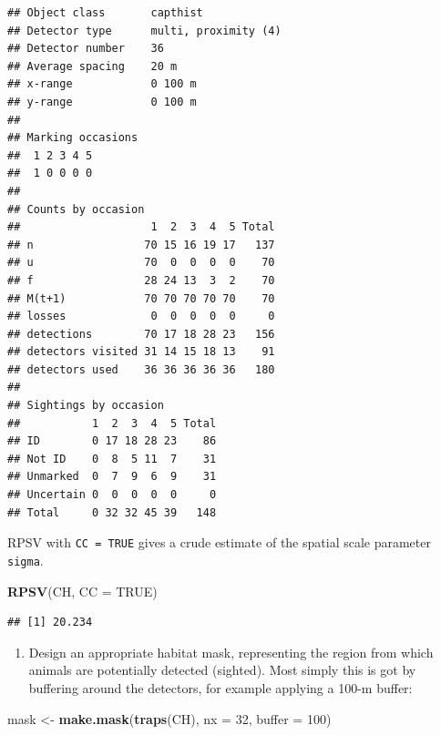 \documentclass[
]{book}
\newenvironment{Shaded}{\begin{snugshade}}{\end{snugshade}}
\newcommand{\AttributeTok}[1]{\textcolor[rgb]{0.13,0.29,0.53}{#1}}
\newcommand{\ConstantTok}[1]{\textcolor[rgb]{0.56,0.35,0.01}{#1}}
\newcommand{\DecValTok}[1]{\textcolor[rgb]{0.00,0.00,0.81}{#1}}
\newcommand{\FunctionTok}[1]{\textcolor[rgb]{0.13,0.29,0.53}{\textbf{#1}}}
\newcommand{\NormalTok}[1]{#1}
\newcommand{\OtherTok}[1]{\textcolor[rgb]{0.56,0.35,0.01}{#1}}
\providecommand{\tightlist}{%
  \setlength{\itemsep}{0pt}\setlength{\parskip}{0pt}}
\begin{document}
\begin{verbatim}
## Object class       capthist 
## Detector type      multi, proximity (4) 
## Detector number    36 
## Average spacing    20 m 
## x-range            0 100 m 
## y-range            0 100 m 
## 
## Marking occasions
##  1 2 3 4 5
##  1 0 0 0 0
## 
## Counts by occasion 
##                    1  2  3  4  5 Total
## n                 70 15 16 19 17   137
## u                 70  0  0  0  0    70
## f                 28 24 13  3  2    70
## M(t+1)            70 70 70 70 70    70
## losses             0  0  0  0  0     0
## detections        70 17 18 28 23   156
## detectors visited 31 14 15 18 13    91
## detectors used    36 36 36 36 36   180
## 
## Sightings by occasion 
##           1  2  3  4  5 Total
## ID        0 17 18 28 23    86
## Not ID    0  8  5 11  7    31
## Unmarked  0  7  9  6  9    31
## Uncertain 0  0  0  0  0     0
## Total     0 32 32 45 39   148
\end{verbatim}

RPSV with \texttt{CC\ =\ TRUE} gives a crude estimate of the spatial scale parameter \texttt{sigma}.

\begin{Shaded}
\begin{Highlighting}[]
\FunctionTok{RPSV}\NormalTok{(CH, }\AttributeTok{CC =} \ConstantTok{TRUE}\NormalTok{)   }
\end{Highlighting}
\end{Shaded}

\begin{verbatim}
## [1] 20.234
\end{verbatim}

\begin{enumerate}
\def\labelenumi{\arabic{enumi}.}
\setcounter{enumi}{5}
\tightlist
\item
  Design an appropriate habitat mask, representing the region from which animals are potentially detected (sighted). Most simply this is got by buffering around the detectors, for example applying a 100-m buffer:
\end{enumerate}

\begin{Shaded}
\begin{Highlighting}[]
\NormalTok{mask }\OtherTok{\textless{}{-}} \FunctionTok{make.mask}\NormalTok{(}\FunctionTok{traps}\NormalTok{(CH), }\AttributeTok{nx =} \DecValTok{32}\NormalTok{, }\AttributeTok{buffer =} \DecValTok{100}\NormalTok{)}
\end{Highlighting}
\end{Shaded}
\end{document}
